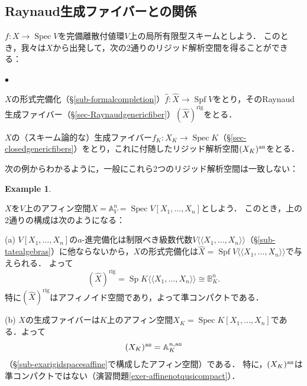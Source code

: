 \documentclass[a4paper,12pt, dvipdfmx]{jsbook}
\def\A{\mathbb{A}}
\def\B{\mathbb{B}}
\def\rig{\mathop{\mathrm{rig}}\nolimits}
\def\Spec{\mathop{\mathrm{Spec}}\nolimits}
\def\Spf{\mathop{\mathrm{Spf}}\nolimits}
\def\Sp{\mathop{\mathrm{Sp}}\nolimits}
\def\an{\textsl{an}}
\def\dl{\langle\!\langle}
\def\dr{\rangle\!\rangle}
\renewenvironment{itemize}%
{%
   \begin{list}{\parbox{1zw}{$\bullet$}}%
   {%
      \setlength{\topsep}{.5zh}
      \setlength{\itemindent}{0zw}
      \setlength{\leftmargin}{3zw}%
      \setlength{\rightmargin}{0zw}%
      \setlength{\labelsep}{.5zw}%
      \setlength{\labelwidth}{3zw}%
      \setlength{\itemsep}{0.2em}%
      \setlength{\parsep}{0em}%
      \setlength{\listparindent}{0zw}%
   }
}{%
   \end{list}%
}
\theoremstyle{plain}
\theoremstyle{definition}
\newtheorem{exa}[thm]{\bfseries Example}
\begin{document}
\subsection{Raynaud生成ファイバーとの関係}\label{sub-relationRaynaudgenericfiber}
$f\colon X\rightarrow\Spec V$を完備離散付値環$V$上の局所有限型スキームとしよう．
このとき，我々は$X$から出発して，次の2通りのリジッド解析空間を得ることができる：
\begin{itemize}
\item[(a)] $X$の形式完備化（\S\ref{sub-formalcompletion}）$\widehat{f}\colon\widehat{X}\rightarrow\Spf V$をとり，そのRaynaud生成ファイバー（\S\ref{sec-Raynaudgenericfiber}）$(\widehat{X})^{\rig}$をとる．
\item[(b)] $X$の（スキーム論的な）生成ファイバー$f_K\colon X_K\rightarrow\Spec K$（\S\ref{sec-closedgenericfibers}）をとり，これに付随したリジッド解析空間$(X_K)^{\an}$をとる．
\end{itemize}

次の例からわかるように，一般にこれら2つのリジッド解析空間は一致しない：
\begin{exa}\label{exa-relationRaynaudgenericfiber}{\rm 
$X$を$V$上のアフィン空間$X=\A^n_V=\Spec V[X_1,\ldots,X_n]$としよう．
このとき，上の2通りの構成は次のようになる：

(a) $V[X_1,\ldots,X_n]$の$a$-進完備化は制限べき級数代数$V\dl X_1,\ldots,X_n\dr$（\S\ref{sub-tatealgebras}）に他ならないから，$X$の形式完備化は$\widehat{X}=\Spf V\dl X_1,\ldots,X_n\dr$で与えられる．
よって
$$
(\widehat{X})^{\rig}=\Sp K\dl X_1,\ldots,X_n\dr\cong\B^n_K.
$$
特に$(\widehat{X})^{\rig}$はアフィノイド空間であり，よって準コンパクトである．

(b) $X$の生成ファイバーは$K$上のアフィン空間$X_K=\Spec K[X_1,\ldots,X_n]$である．よって
$$
(X_K)^{\an}=\A^{n,\an}_K
$$
（\S\ref{sub-exarigidspacesaffine}で構成したアフィン空間）である．
特に，$(X_K)^{\an}$は準コンパクトではない（演習問題\ref{exer-affinenotqusicompact}）．}
\end{exa}
\end{document}
